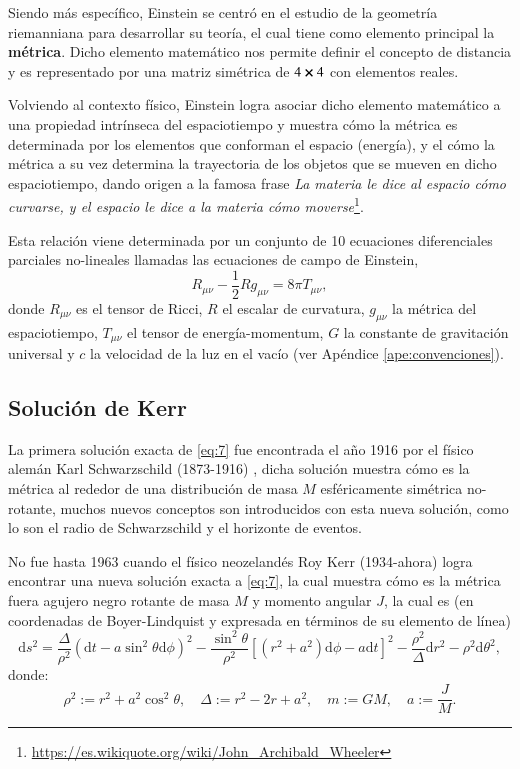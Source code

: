 Siendo más específico, Einstein se centró en el estudio de la geometría riemanniana para desarrollar su teoría, el cual tiene como elemento principal la \textbf{métrica}. Dicho elemento matemático nos permite definir el concepto de distancia y es representado por una matriz simétrica de $4 \cross 4$ con elementos reales.

Volviendo al contexto físico, Einstein logra asociar dicho elemento matemático a una propiedad intrínseca del espaciotiempo y muestra cómo la métrica es determinada por los elementos que conforman el espacio (energía), y el cómo la métrica a su vez determina la trayectoria de los objetos que se mueven en dicho espaciotiempo, dando origen a la famosa frase \textit{La materia le dice al espacio cómo curvarse, y el espacio le dice a la materia cómo moverse}\footnote{\url{https://es.wikiquote.org/wiki/John_Archibald_Wheeler}}.

Esta relación viene determinada por un conjunto de 10 ecuaciones diferenciales parciales no-lineales llamadas las ecuaciones de campo de Einstein,
\begin{equation}
\label{eq:7}
R_{\mu \nu} - \frac{1}{2}R g_{\mu \nu} = 8\pi  T_{\mu \nu},
\end{equation}
donde $R_{\mu \nu}$ es el tensor de Ricci, $R$ el escalar de curvatura, $g_{\mu \nu}$ la métrica del espaciotiempo, $T_{\mu \nu}$ el tensor de energía-momentum, $G$ la constante de gravitación universal y $c$ la velocidad de la luz en el vacío (ver Apéndice \ref{ape:convenciones}).

\subsection{Solución de Kerr}

La primera solución exacta de \eqref{eq:7} fue encontrada el año 1916 por el físico alemán Karl Schwarzschild (1873-1916) \cite{Heinicke}, dicha solución muestra cómo es la métrica al rededor de una distribución de masa $M$ esféricamente simétrica no-rotante, muchos nuevos conceptos son introducidos con esta nueva solución, como lo son el radio de Schwarzschild y el horizonte de eventos.

No fue hasta 1963 cuando el físico neozelandés Roy Kerr (1934-ahora) \cite{Heinicke} logra encontrar una nueva solución exacta a \eqref{eq:7}, la cual muestra cómo es la métrica fuera agujero negro rotante de masa $M$ y momento angular $J$, la cual es (en coordenadas de Boyer-Lindquist y expresada en términos de su elemento de línea)
\begin{equation}
\label{eq:8}
\mathrm{d}s^2 = \frac{\Delta}{\rho^2} \left( \mathrm{d}t - a \sin^2 \theta \mathrm{d}\phi \right)^2 - \frac{\sin^2 \theta}{\rho^2} \left[ (r^2 + a^2)\mathrm{d}\phi - a\mathrm{d}t \right]^2 - \frac{\rho^2}{\Delta} \mathrm{d}r^2 - \rho^2 \mathrm{d}\theta^2,
\end{equation}
donde: 
\begin{equation}
\rho^2 := r^2 + a^2 \cos^2 \theta ,\quad \Delta := r^2 - 2r + a^2, \quad m := GM, \quad a := \frac{J}{M}.
\end{equation}

